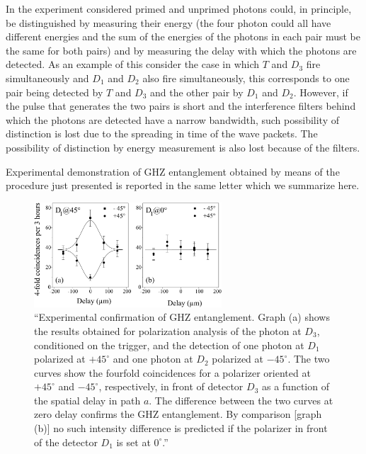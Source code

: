 In the experiment considered primed and unprimed photons could, in principle, be distinguished by measuring their energy (the four photon could all have different energies and the sum of the energies of the photons in each pair must be the same for both pairs) and by measuring the delay with which the photons are detected. As an example of this consider the case in which $T$ and $D_3$ fire simultaneously and $D_1$ and $D_2$ also fire simultaneously, this corresponds to one pair being detected by $T$ and $D_3$ and the other pair by $D_1$ and $D_2$. However, if the pulse that generates the two pairs is short and the interference filters behind which the photons are detected have a narrow bandwidth, such possibility of distinction is lost due to the spreading in time of the wave packets. The possibility of distinction by energy measurement is also lost because of the filters.

Experimental demonstration of GHZ entanglement obtained by means of the procedure just presented is reported in the same letter \cite{PhysRevLett.82.1345} which we summarize here.%

\begin{figure}
  \centering
  \includegraphics[width=0.625\textwidth]{Mainmatter/Chapter3/ghz-entanglement-exp-proof.png}
  \caption{``Experimental confirmation of GHZ entanglement. Graph (a) shows the results obtained for polarization analysis of the photon at $D_3$, conditioned on the trigger, and the detection of one photon at $D_1$ polarized at $+ 45^\circ$ and one photon at $D_2$ polarized at $- 45^\circ$. The two curves show the fourfold coincidences for a polarizer oriented at $+ 45^\circ$ and $- 45^\circ$, respectively, in front of detector $D_3$ as a function of the spatial delay in path $a$. The difference between the two curves at zero delay confirms the GHZ entanglement. By comparison [graph (b)] no such intensity difference is predicted if the polarizer in front of the detector $D_1$ is set at $0^\circ$.'' \cite{PhysRevLett.82.1345}}
  \label{fig:ghz-entanglement-exp-proof}
\end{figure}


